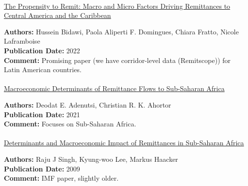 \documentclass[
  11pt,
]{article}
\makeatletter
\let\oldparagraph\paragraph
\renewcommand{\paragraph}{
    \@ifstar
      \xxxParagraphStar
      \xxxParagraphNoStar
  }
\newcommand{\xxxParagraphStar}[1]{\oldparagraph*{#1}\mbox{}}
\newcommand{\xxxParagraphNoStar}[1]{\oldparagraph{#1}\mbox{}}
\makeatother
\begin{document}
\paragraph{\texorpdfstring{\href{https://www.elibrary.imf.org/view/journals/001/2022/203/article-A001-en.xml}{The
Propensity to Remit: Macro and Micro Factors Driving Remittances to
Central America and the
Caribbean}}{The Propensity to Remit: Macro and Micro Factors Driving Remittances to Central America and the Caribbean}}\label{the-propensity-to-remit-macro-and-micro-factors-driving-remittances-to-central-america-and-the-caribbean}

\textbf{Authors:} Hussein Bidawi, Paola Aliperti F. Domingues, Chiara
Fratto, Nicole Laframboise\\
\textbf{Publication Date:} 2022\\
\textbf{Comment:} Promising paper (we have corridor-level data
(Remitscope)) for Latin American countries.

\paragraph{\texorpdfstring{\href{https://www.aercafrica.org/publications/research-papers/macroeconomic-determinants-of-remittance-flows-to-sub-saharan-africa/}{Macroeconomic
Determinants of Remittance Flows to Sub-Saharan
Africa}}{Macroeconomic Determinants of Remittance Flows to Sub-Saharan Africa}}\label{macroeconomic-determinants-of-remittance-flows-to-sub-saharan-africa}

\textbf{Authors:} Deodat E. Adenutsi, Christian R. K. Ahortor\\
\textbf{Publication Date:} 2021\\
\textbf{Comment:} Focuses on Sub-Saharan Africa.

\paragraph{\texorpdfstring{\href{https://www.elibrary.imf.org/view/journals/001/2009/216/article-A001-en.xml}{Determinants
and Macroeconomic Impact of Remittances in Sub-Saharan
Africa}}{Determinants and Macroeconomic Impact of Remittances in Sub-Saharan Africa}}\label{determinants-and-macroeconomic-impact-of-remittances-in-sub-saharan-africa}

\textbf{Authors:} Raju J Singh, Kyung-woo Lee, Markus Haacker\\
\textbf{Publication Date:} 2009\\
\textbf{Comment:} IMF paper, slightly older.
\end{document}
